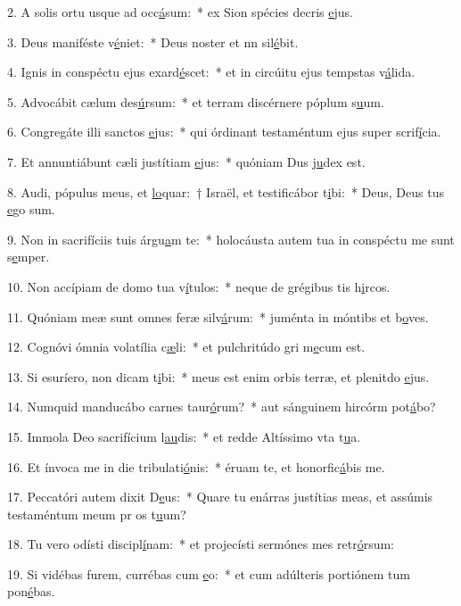 2. A solis ortu usque ad occ\uline{á}sum:~* ex Sion spécies decris \uline{e}jus.\par 
3. Deus maniféste v\uline{é}niet:~* Deus noster et nn sil\uline{é}bit.\par 
4. Ignis in conspéctu ejus exard\uline{é}scet:~* et in circúitu ejus tempstas v\uline{á}lida.\par 
5. Advocábit cælum des\uline{ú}rsum:~* et terram discérnere póplum s\uline{u}um.\par 
6. Congregáte illi sanctos \uline{e}jus:~* qui órdinant testaméntum ejus super scrif\uline{í}cia.\par 
7. Et annuntiábunt cæli justítiam \uline{e}jus:~* quóniam Dus j\uline{u}dex est.\par 
8. Audi, pópulus meus, et \uline{lo}quar:~† Israël, et testificábor t\uline{i}bi:~* Deus, Deus tus \uline{e}go sum.\par 
9. Non in sacrifíciis tuis árgu\uline{a}m te:~* holocáusta autem tua in conspéctu me sunt s\uline{e}mper.\par 
10. Non accípiam de domo tua v\uline{í}tulos:~* neque de grégibus tis h\uline{i}rcos.\par 
11. Quóniam meæ sunt omnes feræ silv\uline{á}rum:~* juménta in móntibs et b\uline{o}ves.\par 
12. Cognóvi ómnia volatília c\uline{æ}li:~* et pulchritúdo gri m\uline{e}cum est.\par 
13. Si esuríero, non dicam t\uline{i}bi:~* meus est enim orbis terræ, et plenitdo \uline{e}jus.\par 
14. Numquid manducábo carnes taur\uline{ó}rum?~* aut sánguinem hircórm pot\uline{á}bo?\par 
15. Immola Deo sacrifícium l\uline{au}dis:~* et redde Altíssimo vta t\uline{u}a.\par 
16. Et ínvoca me in die tribulati\uline{ó}nis:~* éruam te, et honorfic\uline{á}bis me.\par 
17. Peccatóri autem dixit D\uline{e}us:~* Quare tu enárras justítias meas, et assúmis testaméntum meum pr os t\uline{u}um?\par 
18. Tu vero odísti discipl\uline{í}nam:~* et projecísti sermónes mes retr\uline{ó}rsum:\par 
19. Si vidébas furem, currébas cum \uline{e}o:~* et cum adúlteris portiónem tum pon\uline{é}bas.\par 
